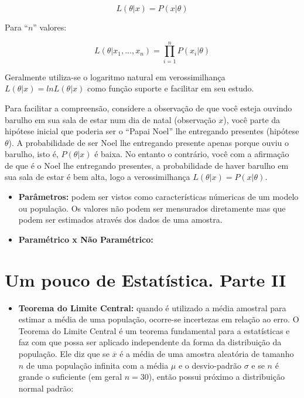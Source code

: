 \documentclass[
]{book}
\providecommand{\tightlist}{%
  \setlength{\itemsep}{0pt}\setlength{\parskip}{0pt}}
\begin{document}
\begin{equation} 
 L(\theta |x)=P(x| \theta)
  \label{eq:fverossimilhanca}
\end{equation}

Para ``\(n\)'' valores:

\begin{equation} 
 L(\theta |x_1,..., x_n)=\prod_{i=1}^{n} P(x_i| \theta)
  \label{eq:fsumverossimilhanca}
\end{equation}

Geralmente utiliza-se o logaritmo natural em verossimilhança \(L(\theta |x)=ln L(\theta|x)\) como função suporte e facilitar em seu estudo.

Para facilitar a compreensão, considere a observação de que você esteja ouvindo barulho em sua sala de estar num dia de natal (observação \(x\)), você parte da hipótese inicial que poderia ser o ``Papai Noel'' lhe entregando presentes (hipótese \(\theta\)). A probabilidade de ser Noel lhe entregando presente apenas porque ouviu o barulho, isto é, \(P(\theta|x)\) é baixa. No entanto o contrário, você com a afirmação de que é o Noel lhe entregando presentes, a probabilidade de haver barulho em sua sala de estar é bem alta, logo a verossimilhança \(L(\theta|x)=P(x|\theta)\).

\begin{itemize}
\item
  \textbf{Parâmetros:} podem ser vistos como características númericas de um modelo ou população. Os valores não podem ser mensurados diretamente mas que podem ser estimados através dos dados de uma amostra.
\item
  \textbf{Paramétrico x Não Paramétrico:}
\end{itemize}

\hypertarget{um-pouco-de-estatuxedstica.-parte-ii}{%
\section{Um pouco de Estatística. Parte II}\label{um-pouco-de-estatuxedstica.-parte-ii}}

\begin{itemize}
\tightlist
\item
  \textbf{Teorema do Limite Central:} quando é utilizado a média amostral para estimar a média de uma população, ocorre-se incertezas em relação ao erro. O Teorema do Limite Central é um teorema fundamental para a estatísticas e faz com que possa ser aplicado independente da forma da distribuição da população. Ele diz que se \(\overline{x}\) é a média de uma amostra aleatória de tamanho \(n\) de uma população infinita com a média \(\mu\) e o desvio-padrão \(\sigma\) e se \(n\) é grande o suficiente (em geral \(n=30\)), então possui próximo a distribuição normal padrão:
\end{itemize}
\end{document}
